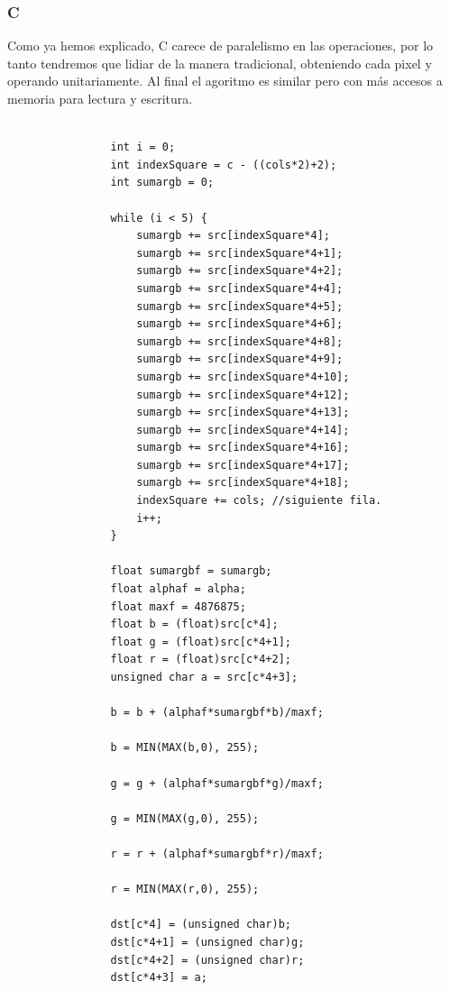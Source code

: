 \subsubsection{C}

Como ya hemos explicado, C carece de paralelismo en las operaciones, por lo tanto tendremos que lidiar de la manera tradicional, obteniendo cada pixel y operando unitariamente. Al final el agoritmo es similar pero con más accesos a memoria para lectura y escritura.

\begin{codesnippet}
\begin{verbatim}

                int i = 0;
                int indexSquare = c - ((cols*2)+2);
                int sumargb = 0;
                
                while (i < 5) {
                    sumargb += src[indexSquare*4];
                    sumargb += src[indexSquare*4+1];
                    sumargb += src[indexSquare*4+2];
                    sumargb += src[indexSquare*4+4];
                    sumargb += src[indexSquare*4+5];
                    sumargb += src[indexSquare*4+6];
                    sumargb += src[indexSquare*4+8];
                    sumargb += src[indexSquare*4+9];
                    sumargb += src[indexSquare*4+10];
                    sumargb += src[indexSquare*4+12];
                    sumargb += src[indexSquare*4+13];
                    sumargb += src[indexSquare*4+14];
                    sumargb += src[indexSquare*4+16];
                    sumargb += src[indexSquare*4+17];
                    sumargb += src[indexSquare*4+18];
                    indexSquare += cols; //siguiente fila.
                    i++;
                }

                float sumargbf = sumargb;
                float alphaf = alpha;
                float maxf = 4876875;
                float b = (float)src[c*4];
                float g = (float)src[c*4+1];
                float r = (float)src[c*4+2];
                unsigned char a = src[c*4+3];

                b = b + (alphaf*sumargbf*b)/maxf;

                b = MIN(MAX(b,0), 255);

                g = g + (alphaf*sumargbf*g)/maxf;

                g = MIN(MAX(g,0), 255);

                r = r + (alphaf*sumargbf*r)/maxf;

                r = MIN(MAX(r,0), 255);

                dst[c*4] = (unsigned char)b;
                dst[c*4+1] = (unsigned char)g;
                dst[c*4+2] = (unsigned char)r;
                dst[c*4+3] = a;
                
\end{verbatim}
\end{codesnippet}

